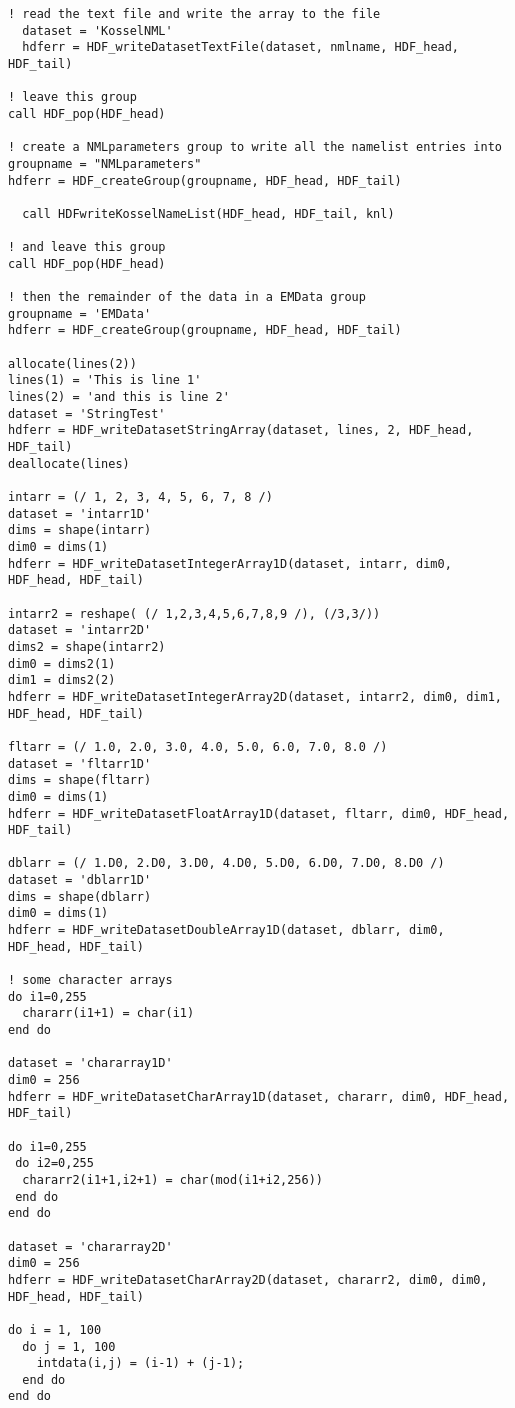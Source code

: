\documentclass[DIV=calc, paper=letter, fontsize=11pt]{scrartcl}	 %
\begin{document}
{\begin{verbatim}
! read the text file and write the array to the file
  dataset = 'KosselNML'
  hdferr = HDF_writeDatasetTextFile(dataset, nmlname, HDF_head, HDF_tail)

! leave this group
call HDF_pop(HDF_head)

! create a NMLparameters group to write all the namelist entries into
groupname = "NMLparameters"
hdferr = HDF_createGroup(groupname, HDF_head, HDF_tail)

  call HDFwriteKosselNameList(HDF_head, HDF_tail, knl)

! and leave this group
call HDF_pop(HDF_head)

! then the remainder of the data in a EMData group
groupname = 'EMData'
hdferr = HDF_createGroup(groupname, HDF_head, HDF_tail)

allocate(lines(2))
lines(1) = 'This is line 1'
lines(2) = 'and this is line 2'
dataset = 'StringTest'
hdferr = HDF_writeDatasetStringArray(dataset, lines, 2, HDF_head, HDF_tail)
deallocate(lines)

intarr = (/ 1, 2, 3, 4, 5, 6, 7, 8 /)
dataset = 'intarr1D'
dims = shape(intarr)
dim0 = dims(1)
hdferr = HDF_writeDatasetIntegerArray1D(dataset, intarr, dim0, HDF_head, HDF_tail)

intarr2 = reshape( (/ 1,2,3,4,5,6,7,8,9 /), (/3,3/))
dataset = 'intarr2D'
dims2 = shape(intarr2)
dim0 = dims2(1)
dim1 = dims2(2)
hdferr = HDF_writeDatasetIntegerArray2D(dataset, intarr2, dim0, dim1, HDF_head, HDF_tail)

fltarr = (/ 1.0, 2.0, 3.0, 4.0, 5.0, 6.0, 7.0, 8.0 /)
dataset = 'fltarr1D'
dims = shape(fltarr)
dim0 = dims(1)
hdferr = HDF_writeDatasetFloatArray1D(dataset, fltarr, dim0, HDF_head, HDF_tail)

dblarr = (/ 1.D0, 2.D0, 3.D0, 4.D0, 5.D0, 6.D0, 7.D0, 8.D0 /)
dataset = 'dblarr1D'
dims = shape(dblarr)
dim0 = dims(1)
hdferr = HDF_writeDatasetDoubleArray1D(dataset, dblarr, dim0, HDF_head, HDF_tail)

! some character arrays
do i1=0,255
  chararr(i1+1) = char(i1)
end do

dataset = 'chararray1D'
dim0 = 256
hdferr = HDF_writeDatasetCharArray1D(dataset, chararr, dim0, HDF_head, HDF_tail)

do i1=0,255
 do i2=0,255
  chararr2(i1+1,i2+1) = char(mod(i1+i2,256))
 end do
end do

dataset = 'chararray2D'
dim0 = 256
hdferr = HDF_writeDatasetCharArray2D(dataset, chararr2, dim0, dim0, HDF_head, HDF_tail)

do i = 1, 100
  do j = 1, 100
    intdata(i,j) = (i-1) + (j-1);
  end do
end do


\end{verbatim}}
\end{document}
